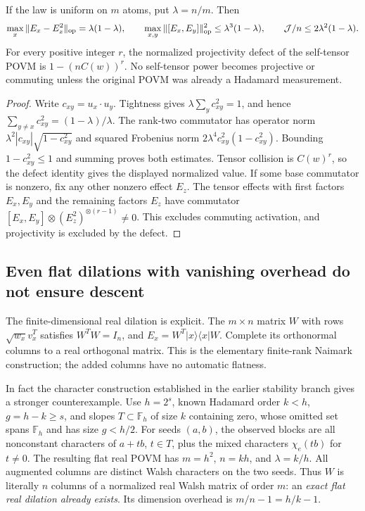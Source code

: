 \begin{theorem}
If the law is uniform on $m$ atoms, put $\lambda=n/m$. Then
\[
 \max_x\|E_x-E_x^2\|_{\rm op}=\lambda(1-\lambda),\qquad
 \max_{x,y}\|[E_x,E_y]\|_{\rm op}^2
 \le\lambda^3(1-\lambda),\qquad
 \mathcal J/n\le2\lambda^2(1-\lambda).
\]
For every positive integer $r$, the normalized projectivity defect
of the self-tensor POVM is $1-(nC(w))^r$.
No self-tensor power becomes projective or commuting unless the
original POVM was already a Hadamard measurement.
\end{theorem}
\begin{proof}
Write $c_{xy}=u_x\cdot u_y$. Tightness gives
$\lambda\sum_yc_{xy}^2=1$, and hence
$\sum_{y\ne x}c_{xy}^2=(1-\lambda)/\lambda$.
The rank-two commutator has operator norm
$\lambda^2|c_{xy}|\sqrt{1-c_{xy}^2}$ and squared Frobenius norm
$2\lambda^4c_{xy}^2(1-c_{xy}^2)$. Bounding $1-c_{xy}^2\le1$
and summing proves both estimates. Tensor collision is $C(w)^r$,
so the defect identity gives the displayed normalized value.
If some base commutator is nonzero, fix any other nonzero effect $E_z$.
The tensor effects with first factors $E_x,E_y$ and the remaining
factors $E_z$ have commutator
$[E_x,E_y]\otimes(E_z^2)^{\otimes(r-1)}\ne0$. This excludes
commuting activation, and projectivity is excluded by the defect.
\end{proof}

\subsection{Even flat dilations with vanishing overhead do not ensure descent}
The finite-dimensional real dilation is explicit. The $m\times n$
matrix $W$ with rows $\sqrt{w_x}v_x^T$ satisfies $W^TW=I_n$, and
$E_x=W^T|x\rangle\langle x|W$. Complete its orthonormal columns to
a real orthogonal matrix. This is the elementary finite-rank
Naimark construction; the added columns have no automatic flatness.

In fact the character construction established in the earlier
stability branch gives a stronger counterexample. Use $h=2^s$,
known Hadamard order $k<h$, $g=h-k\ge s$, and slopes
$T\subset\mathbb F_h$ of size $k$ containing zero, whose omitted
set spans $\mathbb F_h$ and has size $g<h/2$.
For seeds $(a,b)$, the observed blocks are all nonconstant characters
of $a+tb$, $t\in T$, plus the mixed characters $\chi_e(tb)$ for
$t\ne0$. The resulting flat real POVM has
$m=h^2$, $n=kh$, and $\lambda=k/h$.
All augmented columns are distinct Walsh characters on the two
seeds. Thus $W$ is literally $n$ columns of a normalized real Walsh
matrix of order $m$: an \emph{exact flat real dilation already exists}.
Its dimension overhead is $m/n-1=h/k-1$.

